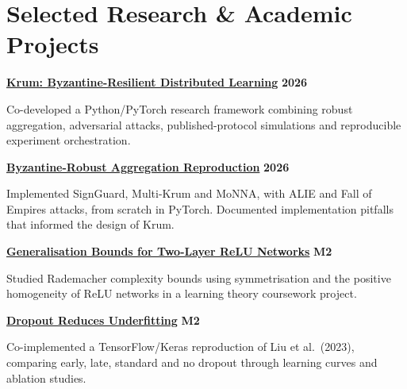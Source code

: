 \section{Selected Research \& Academic Projects}

\textbf{\href{https://links.arthurdanjou.fr/krum}
  {Krum: Byzantine-Resilient Distributed Learning}} \hfill \textbf{2026}\par
Co-developed a Python/PyTorch research framework combining robust aggregation,
adversarial attacks, published-protocol simulations and reproducible experiment
orchestration.

\vspace{5pt}
\textbf{\href{https://links.arthurdanjou.fr/byzantine-reproduction}
  {Byzantine-Robust Aggregation Reproduction}} \hfill \textbf{2026}\par
Implemented SignGuard, Multi-Krum and MoNNA, with ALIE and Fall of Empires
attacks, from scratch in PyTorch. Documented implementation pitfalls that
informed the design of Krum.

\vspace{5pt}

\textbf{\href{https://links.arthurdanjou.fr/lt-two-layers-neural-networks}
  {Generalisation Bounds for Two-Layer ReLU Networks}} \hfill \textbf{M2}\par
Studied Rademacher complexity bounds using symmetrisation and the positive
homogeneity of ReLU networks in a learning theory coursework project.

\vspace{5pt}
\textbf{\href{https://links.arthurdanjou.fr/dl-dropout-reduces-underfitting}
  {Dropout Reduces Underfitting}} \hfill \textbf{M2}\par
Co-implemented a TensorFlow/Keras reproduction of Liu et al.\ (2023), comparing
early, late, standard and no dropout through learning curves and ablation studies.
